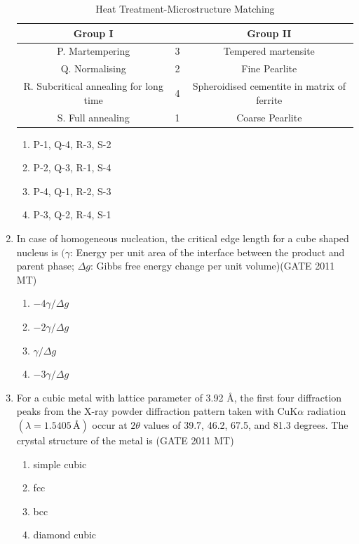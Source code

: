 \documentclass[12pt]{article}
\begin{document}
\begin{enumerate}
\begin{table}[h]
\centering
\caption{Heat Treatment-Microstructure Matching}
\begin{tabular}{|c|c|c|}
\hline
\textbf{Group I} & & \textbf{Group II} \\
\hline
P. Martempering & 3 & Tempered martensite \\
Q. Normalising & 2 & Fine Pearlite \\
R. Subcritical annealing for long time & 4 & Spheroidised cementite in matrix of ferrite \\
S. Full annealing & 1 & Coarse Pearlite \\
\hline
\end{tabular}
\end{table}
\begin{enumerate}[label=(\Alph*)]
    \item P-1, Q-4, R-3, S-2
    \item P-2, Q-3, R-1, S-4
    \item P-4, Q-1, R-2, S-3
    \item P-3, Q-2, R-4, S-1
\end{enumerate}
\item In case of homogeneous nucleation, the critical edge length for a cube shaped nucleus is $(\gamma$: Energy per unit area of the interface between the product and parent phase; $\Delta g$: Gibbs free energy change per unit volume)(GATE 2011 MT)
    \begin{enumerate}
        \item $-4\gamma/\Delta g$
        \item $-2\gamma/\Delta g$
        \item $\gamma/\Delta g$
        \item $-3\gamma/\Delta g$
    \end{enumerate}
\item For a cubic metal with lattice parameter of 3.92 Å, the first four diffraction peaks from the X-ray powder diffraction pattern taken with CuK$\alpha$ radiation $(\lambda = 1.5405\, \text{\AA})$ occur at $2\theta$ values of 39.7, 46.2, 67.5, and 81.3 degrees. The crystal structure of the metal is (GATE 2011 MT)
    \begin{enumerate}
        \item simple cubic
        \item fcc
        \item bcc
        \item diamond cubic
    \end{enumerate}

\end{enumerate}
\end{document}
